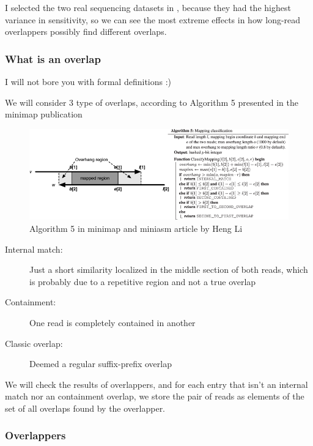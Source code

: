 \documentclass[./main.tex]{subfiles}
\begin{document}
I selected the two real sequencing datasets in \citeauthor{ovl_bench},
because they had the highest variance in sensitivity, so we can see the
most extreme effects in how long-read overlappers possibly find
different overlaps.

\subsubsection{What is an overlap}\label{preassembly:ovl:what-is-an-overlap}

I will not bore you with formal definitions :)

We will consider 3 type of overlaps, according to Algorithm 5 presented
in the minimap publication\cite{minimap} 

\begin{figure}[ht]
\centering
\includegraphics[width=\textwidth]{paper/blog_post/minimap_ovl_filter.png}
\caption{Algorithm 5 in minimap and miniasm article by Heng Li}
\end{figure}

\begin{description}
\item[Internal match:] Just a short similarity localized in the middle section of both reads,
which is probably due to a repetitive region and not a true overlap
\item[Containment:] One read is completely contained in another
\item[Classic overlap:] Deemed a regular suffix-prefix overlap
\end{description}

We will check the results of overlappers, and for each entry that isn't
an internal match nor an containment overlap, we store the pair of reads
as elements of the set of all overlaps found by the overlapper.

\subsubsection{Overlappers}\label{preassembly:ovl:overlappers}
\end{document}
